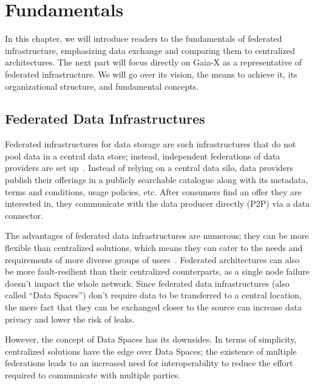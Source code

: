 \chapter{Fundamentals}\label{ch:fundamentals}

\begin{chapterabstract}
    In this chapter, we will introduce readers to the fundamentals of federated infrastructure, emphasizing data exchange and comparing them to centralized architectures.
    The next part will focus directly on Gaia-X as a representative of federated infrastructure.
    We will go over its vision, the means to achieve it, its organizational structure, and fundamental concepts.
\end{chapterabstract}

\section{Federated Data Infrastructures}\label{sec:federated-data-infrastructures}

Federated infrastructures for data storage are such infrastructures that do not pool data in a central data store; instead, independent federations of data providers are set up~\cite{otto_federated_2022}.
Instead of relying on a central data silo, data providers publish their offerings in a publicly searchable catalogue along with its metadata, terms and conditions, usage policies, etc.
After consumers find an offer they are interested in, they communicate with the data producer directly (P2P) via a data connector.

The advantages of federated data infrastructures are numerous; they can be more flexible than centralized solutions, which means they can cater to the needs and requirements of more diverse groups of users~\cite{raab_federated_2023}.
Federated architectures can also be more fault-resilient than their centralized counterparts, as a single node failure doesn't impact the whole network.
Since federated data infrastructures (also called ``Data Spaces'') don't require data to be transferred to a central location, the mere fact that they can be exchanged closer to the source can increase data privacy and lower the risk of leaks.

However, the concept of Data Spaces has its downsides.
In terms of simplicity, centralized solutions have the edge over Data Spaces; the existence of multiple federations leads to an increased need for interoperability to reduce the effort required to communicate with multiple parties.

